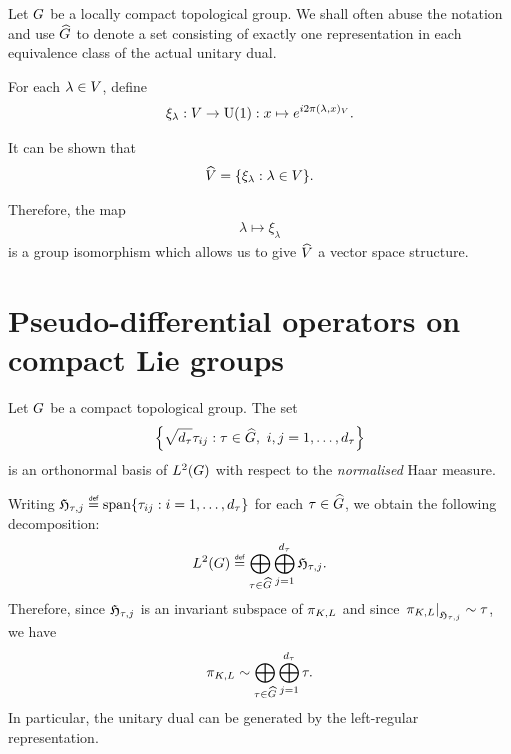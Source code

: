 \begin{remark}
    Let $G$ be a locally compact topological group.
    We shall often abuse the notation and use ${\widehat{G}}$ to denote a set consisting of
    exactly one representation in each equivalence class of the actual unitary dual.
\end{remark}

\begin{example}[$\dualGroup\VectorSpace$]
    For each $\lambda \in V$,
    define
    \begin{align}
        \xi_\lambda : V \to {\mathrm{U} (1)} : x \mapsto e^{i 2 \pi {(\lambda, x)_{V}}}.
        \label{eq:elements_of_dual_of_vector_space}
    \end{align}

    It can be shown that
    \begin{align*}
        {\widehat{V}} = \{ \xi_\lambda : \lambda \in V \}.
    \end{align*}

    Therefore, the map
    \begin{align}
        \lambda \mapsto \xi_\lambda
        \label{eq:isomorphism_between_vector_space_and_its_dual_group}
    \end{align}
    is a group isomorphism which allows us to give $\dualGroup\VectorSpace$ a vector space structure.
\end{example}

\section{Pseudo-differential operators on compact Lie groups}

\begin{theorem}
\label{theorem:Peter-Weyl_theorem}
    Let $G$ be a compact topological group.
    The set
    \begin{align*}
        \left\{
            \sqrt{\dimRep\tau} \tau_{ij} : \tau \in \dualGroup\Group,\ i, j = 1, \dots, \dimRep\tau
        \right\}
    \end{align*}
    is an orthonormal basis of ${L^{2} (G)}$ with respect to the \emph{normalised} Haar measure.

    Writing $\Hilbert{\tau}{j} \defeq \Span\{\tau_{ij} : i = 1, \dots, \dimRep\tau\}$
    for each $\tau \in {\widehat{G}}$,
    we obtain the following decomposition:
    \begin{align*}
        \Lebesgue{2}{\Group} \defeq
        \bigoplus_{\tau \in \dualGroup\Group} \bigoplus_{j = 1}^{\dimRep \tau} \Hilbert{\tau}{j}.
    \end{align*}
    Therefore,
    since $\mathfrak{H}_{\tau, j}$ is an invariant subspace of $\pi_{K, L}$
    and since $\left. \pi_{K, L} \right|_{\mathfrak{H}_{\tau, j}} \sim \tau$,
    we have
    \begin{align*}
        \pi_{K, L} \sim
        \bigoplus_{\tau \in {\widehat{G}}} \bigoplus_{j = 1}^{{d_{\tau}}} \tau.
    \end{align*}
    In particular, the unitary dual can be generated by the left-regular representation.
\end{theorem}

